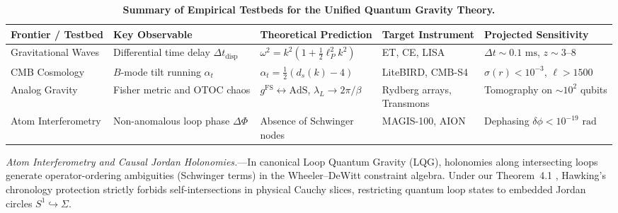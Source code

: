 \documentclass[aps,prl,reprint,twocolumn,superscriptaddress,nofootinbib,floatfix]{revtex4-2}
\begin{document}
\begin{table}[t]
\centering
\caption{\textbf{Summary of Empirical Testbeds for the Unified Quantum Gravity Theory.}}
\label{tab:experiments}
\begin{ruledtabular}
\begin{tabular}{lllll}
\textbf{Frontier / Testbed} & \textbf{Key Observable} & \textbf{Theoretical Prediction} & \textbf{Target Instrument} & \textbf{Projected Sensitivity} \\
\midrule
Gravitational Waves & \parbox[t]{3.2cm}{\raggedright Differential time delay $\Delta t_{\mathrm{disp}}$} & $\omega^2 = k^2(1 + \frac{1}{2}\ell_P^2 k^2)$ & ET, CE, LISA & \parbox[t]{3.2cm}{\raggedright $\Delta t \sim 0.1\text{ ms}$,\\$z \sim 3$--$8$} \\
\addlinespace[3pt]
CMB Cosmology & \parbox[t]{3.2cm}{\raggedright $B$-mode tilt running $\alpha_t$} & $\alpha_t = \frac{1}{2}(d_s(k) - 4)$ & LiteBIRD, CMB-S4 & \parbox[t]{3.2cm}{\raggedright $\sigma(r) < 10^{-3}$,\\$\ell > 1500$} \\
\addlinespace[3pt]
Analog Gravity & \parbox[t]{3.2cm}{\raggedright Fisher metric and OTOC chaos} & \parbox[t]{3.6cm}{\raggedright $g^{\mathrm{FS}} \leftrightarrow \mathrm{AdS}$,\\$\lambda_L \to 2\pi / \beta$} & \parbox[t]{3.0cm}{\raggedright Rydberg arrays,\\Transmons} & \parbox[t]{3.2cm}{\raggedright Tomography on $\sim 10^2$ qubits} \\
\addlinespace[3pt]
Atom Interferometry & \parbox[t]{3.2cm}{\raggedright Non-anomalous loop phase $\Delta \Phi$} & \parbox[t]{3.6cm}{\raggedright Absence of Schwinger\\nodes} & MAGIS-100, AION & \parbox[t]{3.2cm}{\raggedright Dephasing\\$\delta \phi < 10^{-19}\text{ rad}$} \\
\end{tabular}
\end{ruledtabular}
\end{table}

\emph{Atom Interferometry and Causal Jordan Holonomies.}---In canonical Loop Quantum Gravity (LQG), holonomies along intersecting loops generate operator-ordering ambiguities (Schwinger terms) in the Wheeler--DeWitt constraint algebra. Under our Theorem~4.1 \cite{silvafilho2026grand}, Hawking's chronology protection strictly forbids self-intersections in physical Cauchy slices, restricting quantum loop states to embedded Jordan circles $S^1 \hookrightarrow \Sigma$.
\end{document}
